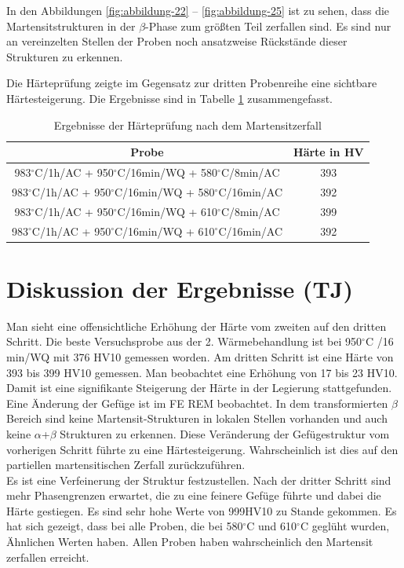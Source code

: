 In den Abbildungen \ref{fig:abbildung-22} -- \ref{fig:abbildung-25} ist zu sehen, dass die Martensitstrukturen in der $\beta$-Phase zum größten Teil zerfallen sind. Es sind nur an vereinzelten Stellen der Proben noch ansatzweise Rückstände dieser Strukturen zu erkennen.

Die Härteprüfung zeigte im Gegensatz zur dritten Probenreihe eine sichtbare Härtesteigerung. Die Ergebnisse sind in Tabelle \ref{Tabelle 8} zusammengefasst.

\begin{table}[h]
	\centering
	\begin{tabular}{|c|c|}
		\hline 
		Probe & Härte in HV \\ 
		\hline 
		983$^\circ$C/1h/AC + 950$^\circ$C/16min/WQ + 580$^\circ$C/8min/AC & 393 \\ 
		\hline 
		983$^\circ$C/1h/AC + 950$^\circ$C/16min/WQ + 580$^\circ$C/16min/AC & 392 \\ 
		\hline 
		983$^\circ$C/1h/AC + 950$^\circ$C/16min/WQ + 610$^\circ$C/8min/AC & 399 \\ 
		\hline 
		983$^\circ$C/1h/AC + 950$^\circ$C/16min/WQ + 610$^\circ$C/16min/AC & 392 \\ 
		\hline 
	\end{tabular} 
	\caption{Ergebnisse der Härteprüfung nach dem Martensitzerfall}
	\label{Tabelle 8}
\end{table}

\section{Diskussion der Ergebnisse (TJ)}

Man sieht eine offensichtliche Erhöhung der Härte vom zweiten auf den dritten Schritt. Die beste Versuchsprobe aus der 2. Wärmebehandlung ist bei 950$^\circ$C /16 min/WQ mit 376 HV10 gemessen worden. Am dritten Schritt ist eine Härte von 393 bis 399 HV10 gemessen. Man beobachtet eine Erhöhung von 17 bis 23 HV10. Damit ist eine signifikante Steigerung der Härte in der Legierung stattgefunden. Eine Änderung der Gefüge ist im FE REM beobachtet. In dem transformierten $\beta$ Bereich sind keine Martensit-Strukturen in lokalen Stellen vorhanden und auch keine $\alpha$+$\beta$ Strukturen zu erkennen. Diese Veränderung der Gefügestruktur vom vorherigen Schritt führte zu eine Härtesteigerung. Wahrscheinlich ist dies auf den partiellen martensitischen Zerfall zurückzuführen.
\\Es ist eine Verfeinerung der Struktur festzustellen. Nach der dritter Schritt sind mehr Phasengrenzen erwartet, die zu eine feinere Gefüge führte und dabei die Härte gestiegen. Es sind sehr hohe Werte von 999HV10 zu Stande gekommen. Es hat sich gezeigt, dass bei alle Proben, die bei 580$^\circ$C und 610$^\circ$C geglüht wurden, Ähnlichen Werten haben. Allen Proben haben wahrscheinlich den Martensit zerfallen erreicht.
